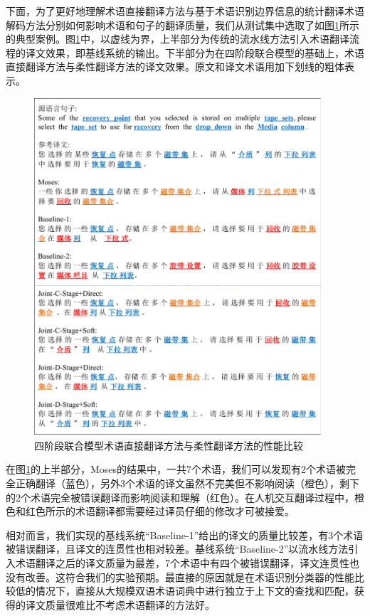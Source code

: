 下面，为了更好地理解术语直接翻译方法与基于术语识别边界信息的统计翻译术语解码方法分别如何影响术语和句子的翻译质量，我们从测试集中选取了如图\ref{Fig_term_joint_example}所示的典型案例。图\ref{Fig_term_joint_example}中，以虚线为界，上半部分为传统的流水线方法引入术语翻译流程的译文效果，即基线系统的输出。下半部分为在四阶段联合模型的基础上，术语直接翻译方法与柔性翻译方法的译文效果。原文和译文术语用加下划线的粗体表示。

\begin{figure}[!tb]
	\centering
	\includegraphics[width=0.95\textwidth]{Figure/Figure_4_7.pdf}
	\caption{四阶段联合模型术语直接翻译方法与柔性翻译方法的性能比较}
	\label{Fig_term_joint_example}
\end{figure}

在图\ref{Fig_term_joint_example}的上半部分，Moses的结果中，一共7个术语，我们可以发现有2个术语被完全正确翻译（蓝色），另外3个术语的译文虽然不完美但不影响阅读（橙色），剩下的2个术语完全被错误翻译而影响阅读和理解（红色）。在人机交互翻译过程中，橙色和红色所示的术语翻译都需要经过译员仔细的修改才可被接爱。

相对而言，我们实现的基线系统“Baseline-1”给出的译文的质量比较差，有3个术语被错误翻译，且译文的连贯性也相对较差。基线系统“Baseline-2”以流水线方法引入术语翻译之后的译文质量为最差，7个术语中有四个被错误翻译，译文连贯性也没有改善。这符合我们的实验预期。最直接的原因就是在术语识别分类器的性能比较低的情况下，直接从大规模双语术语词典中进行独立于上下文的查找和匹配，获得的译文质量很难比不考虑术语翻译的方法好。

